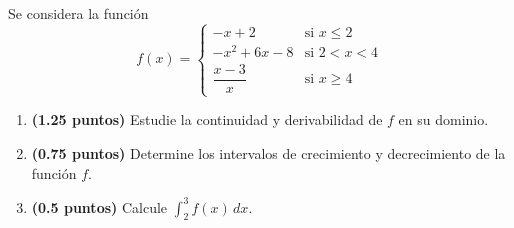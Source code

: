 
Se considera la función
\[
f(x)=\begin{cases}
-x+2 & \text{si }x\leq 2\\
-x^2+6x-8 & \text{si }2<x<4\\
\dfrac{x-3}{x} & \text{si }x\geq 4
\end{cases}
\]
\begin{enumerate}[label=\alph*)]
  \item \textbf{(1.25 puntos)} Estudie la continuidad y derivabilidad de $f$
  en su dominio.
  \item \textbf{(0.75 puntos)} Determine los intervalos de crecimiento y
  decrecimiento de la función $f$.
  \item \textbf{(0.5 puntos)} Calcule $\displaystyle\int_2^3 f(x)\,dx$.
\end{enumerate}
